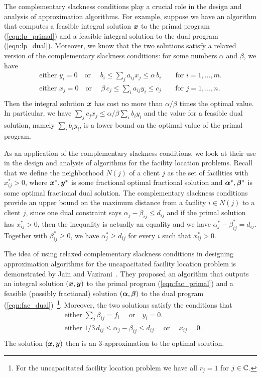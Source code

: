 \documentclass[oneside,final]{ucr}
\begin{document}
The complementary slackness conditions play a crucial role
in the design and analysis of approximation algorithms. For
example, suppose we have an algorithm that computes a
feasible integral solution $\boldsymbol{x}$ to the primal program
(\ref{eqn:lp_primal}) and a feasible integral solution to
the dual program (\ref{eqn:lp_dual}). Moreover, we know that
the two solutions satisfy a relaxed version of the
complementary slackness conditions: for some numbers
$\alpha$ and $\beta$, we have
\begin{align*}
  \text{either } y_i = 0  \quad \text{or } \quad b_i \leq \sum_{j}
  a_{ij} x_j \leq \alpha\, b_i \qquad \text{for } i = 1,
  \ldots, m.\\
  \text{either } x_j = 0  \quad \text{or } \quad \beta\, c_j \leq
  \sum_{i}a_{ij}y_i \leq c_j \qquad \text{for } j = 1,
  \ldots, n.\\
\end{align*}
Then the integral solution $\boldsymbol{x}$ has cost no more than
$\alpha/\beta$ times the optimal value. In particular, we
have $\sum_{j} c_j x_j \leq \alpha/\beta \sum_{i} b_i y_i$
and the value for a feasible dual solution, namely $\sum_{i}
b_i y_i$, is a lower bound on the optimal value of the
primal program.

As an application of the complementary slackness conditions,
we look at their use in the design and analysis of
algorithms for the facility location problems. Recall that
we define the neighborhood $N(j)$ of a client $j$ as the set
of facilities with $x_{ij}^\ast > 0$, where
$\boldsymbol{x}^\ast,\boldsymbol{y}^\ast$ is some fractional optimal fractional
solution and $\boldsymbol{\alpha}^\ast, \boldsymbol{\beta}^\ast$ is some optimal
fractional dual solution. The complementary slackness
conditions provide an upper bound on the maximum distance
from a facility $i \in N(j)$ to a client $j$, since one dual
constraint says $\alpha_j - \beta_{ij} \leq d_{ij}$ and if
the primal solution has $x_{ij}^\ast > 0$, then the
inequality is actually an equality and we have
$\alpha_j^\ast - \beta_{ij}^\ast = d_{ij}$. Together with
$\beta_{ij}^\ast \geq 0$, we have $\alpha_j^\ast \geq
d_{ij}$ for every $i$ such that $x_{ij}^\ast > 0$.

The idea of using relaxed complementary slackness conditions
in designing approximation algorithms for the uncapacitated
facility location problem is demonstrated by Jain and
Vazirani~\cite{JainV01}. They proposed an algorithm that
outputs an integral solution $(\boldsymbol{x}, \boldsymbol{y})$ to the primal
program (\ref{eqn:fac_primal}) and a feasible (possibly
fractional) solution $(\boldsymbol{\alpha},\boldsymbol{\beta})$ to the dual
program (\ref{eqn:fac_dual})~\footnote{For the uncapacitated
  facility location problem we have all $r_j = 1$ for
  $j\in\mathbb{C}$.}. Moreover, the two solutions satisfy the
conditions that
\begin{align*}
  &\text{either } \sum_{j} \beta_{ij} = f_i  \quad \text{ or
} \quad y_i = 0.\\
  &\text{either } 1/3\, d_{ij} \leq \alpha_j - \beta_{ij}
  \leq d_{ij} \quad \text{ or } \quad x_{ij} = 0.\\
\end{align*}
The solution $(\boldsymbol{x},\boldsymbol{y})$ then is an $3$-approximation to
the optimal solution.
\end{document}
